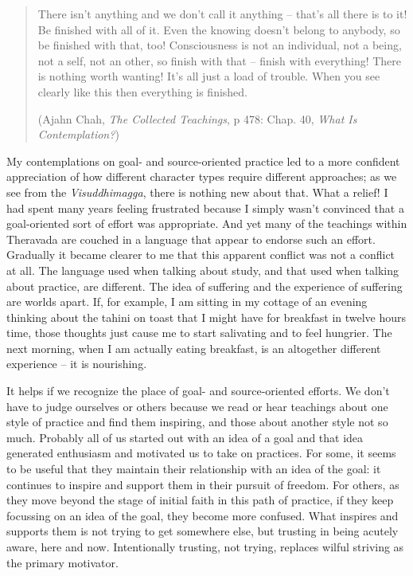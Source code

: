 \begin{quotation}
There isn't anything and we don't call it anything -- that's all there
is to it! Be finished with all of it. Even the knowing doesn't belong to
anybody, so be finished with that, too! Consciousness is not an
individual, not a being, not a self, not an other, so finish with that
-- finish with everything! There is nothing worth wanting! It's all just
a load of trouble. When you see clearly like this then everything is
finished.

(Ajahn Chah, \emph{The Collected Teachings}\cite{collected}, p 478: Chap. 40, \emph{What Is Contemplation?})
\end{quotation}

My contemplations on goal- and source-oriented practice led to a more
confident appreciation of how different character types require
different approaches; as we see from the \emph{Visuddhimagga}, there is
nothing new about that. What a relief! I had spent many years feeling
frustrated because I simply wasn't convinced that a goal-oriented sort
of effort was appropriate. And yet many of the teachings within
Theravada are couched in a language that appear to endorse such an
effort. Gradually it became clearer to me that this apparent conflict
was not a conflict at all. The language used when talking about study,
and that used when talking about practice, are different. The idea of
suffering and the experience of suffering are worlds apart. If, for
example, I am sitting in my cottage of an evening thinking about the
tahini on toast that I might have for breakfast in twelve hours time,
those thoughts just cause me to start salivating and to feel hungrier.
The next morning, when I am actually eating breakfast, is an altogether
different experience -- it is nourishing.

It helps if we recognize the place of goal- and source-oriented efforts.
We don't have to judge ourselves or others because we read or hear
teachings about one style of practice and find them inspiring, and those
about another style not so much. Probably all of us started out with an
idea of a goal and that idea generated enthusiasm and motivated us to
take on practices. For some, it seems to be useful that they maintain
their relationship with an idea of the goal: it continues to inspire and
support them in their pursuit of freedom. For others, as they move
beyond the stage of initial faith in this path of practice, if they keep
focussing on an idea of the goal, they become more confused. What
inspires and supports them is not trying to get somewhere else, but
trusting in being acutely aware, here and now. Intentionally trusting,
not trying, replaces wilful striving as the primary motivator.

